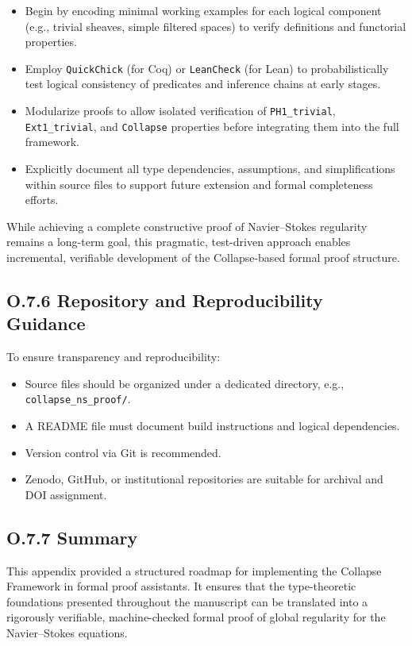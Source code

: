 \documentclass[11pt]{article}
\begin{document}
\begin{itemize}
  \item Begin by encoding minimal working examples for each logical component (e.g., trivial sheaves, simple filtered spaces) to verify definitions and functorial properties.
  \item Employ \texttt{QuickChick} (for Coq) or \texttt{LeanCheck} (for Lean) to probabilistically test logical consistency of predicates and inference chains at early stages.
  \item Modularize proofs to allow isolated verification of \texttt{PH1\_trivial}, \texttt{Ext1\_trivial}, and \texttt{Collapse} properties before integrating them into the full framework.
  \item Explicitly document all type dependencies, assumptions, and simplifications within source files to support future extension and formal completeness efforts.
\end{itemize}

While achieving a complete constructive proof of Navier–Stokes regularity remains a long-term goal, this pragmatic, test-driven approach enables incremental, verifiable development of the Collapse-based formal proof structure.


\subsection*{O.7.6 Repository and Reproducibility Guidance}

To ensure transparency and reproducibility:

\begin{itemize}
  \item Source files should be organized under a dedicated directory, e.g., \texttt{collapse\_ns\_proof/}.
  \item A README file must document build instructions and logical dependencies.
  \item Version control via Git is recommended.
  \item Zenodo, GitHub, or institutional repositories are suitable for archival and DOI assignment.
\end{itemize}

\subsection*{O.7.7 Summary}

This appendix provided a structured roadmap for implementing the Collapse Framework in formal proof assistants.  
It ensures that the type-theoretic foundations presented throughout the manuscript can be translated into a rigorously verifiable, machine-checked formal proof of global regularity for the Navier–Stokes equations.
\end{document}
